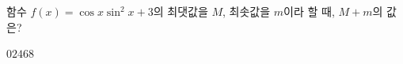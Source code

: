 함수 $f(x)=\cos x\sin^2 x+3$의 최댓값을 $M$, 최솟값을 $m$이라 할 때, $M+m$의 값은?
\begin{choices32}{$0$}{$2$}{$4$}{$6$}{$8$}\end{choices32}
